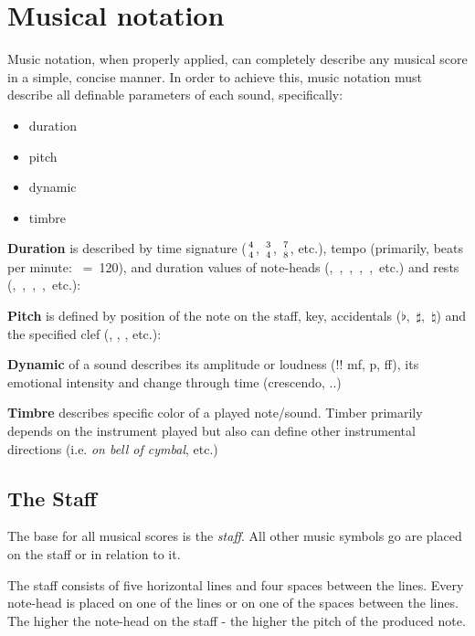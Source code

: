\chapter{Musical notation}\label{ch:music_notation}

Music notation, when properly applied, can completely describe any musical score in a simple, concise manner. In order
to achieve this, music notation must describe all definable parameters of each sound, specifically\cite{mcgrain1990music}:

\begin{itemize}
    \item duration
    \item pitch
    \item dynamic
    \item timbre
\end{itemize}

\textbf{Duration} is described by time signature ($4\atop4$, $3\atop4$, $7\atop8$, etc.), tempo (primarily, beats per
minute: \Vier~=~120), and duration values of note-heads (\Ganz,~\Halb,~\Vier,~\AAcht,~\Sech,~etc.) and rests
(\GaPa,~\ViPa,~\AcPa,~\SePa,~etc.):

\figcenter{}


\textbf{Pitch} is defined by position of the note on the staff, key, accidentals ($\flat$,~$\sharp$,~$\natural$) and
the specified clef (\inlinemusic\smalltrebleclef, \inlinemusic\smallbassclef, \inlinemusic\smallaltoclef, etc.):

\figcenter{}


\textbf{Dynamic} of a sound describes its amplitude or loudness (!! mf, p, ff), its emotional intensity and change
through time (crescendo, ..)

\textbf{Timbre} describes specific color of a played note/sound. Timber primarily depends on the instrument played but
also can define other instrumental directions (i.e. \textit{on bell of cymbal}, etc.)


\section{The Staff}\label{sec:the_staff}
The base for all musical scores is the \textit{staff}. All other music symbols go are placed on the staff or in relation
to it.

The staff consists of five horizontal lines and four spaces between the lines. Every note-head is placed on one of
the lines or on one of the spaces between the lines. The higher the note-head on the staff - the higher the pitch of
the produced note.

